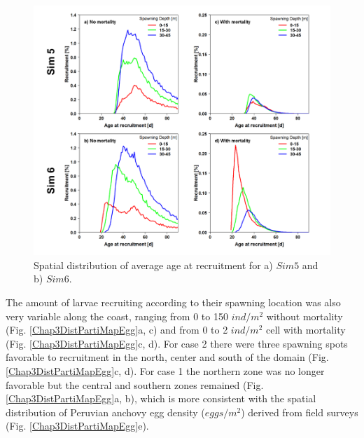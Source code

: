 \begin{figure}[H]
	\includegraphics[width=1.0\textwidth]{figures/Chap3LinesAgeRecruSim5Sim6.png}
	\centering
	\caption{Spatial distribution of average age at recruitment for a) $Sim5$ and b) $Sim6$.}
	\label{Chap3LinesAgeRecruSim5Sim6}
\end{figure}

The amount of larvae recruiting according to their spawning location was also very variable along the coast, ranging from 0 to 150 $ind/m^2$ without mortality (Fig. \ref{Chap3DistPartiMapEgg}a, c) and from 0 to 2 $ind/m^2$ cell with mortality (Fig. \ref{Chap3DistPartiMapEgg}c, d). For case 2 there were three spawning spots favorable to recruitment in the north, center and south of the domain (Fig. \ref{Chap3DistPartiMapEgg}c, d). For case 1 the northern zone was no longer favorable but the central and southern zones remained (Fig. \ref{Chap3DistPartiMapEgg}a, b), which is more consistent with the spatial distribution of Peruvian anchovy egg density ($eggs/m^2$) derived from field surveys (Fig. \ref{Chap3DistPartiMapEgg}e).\\

